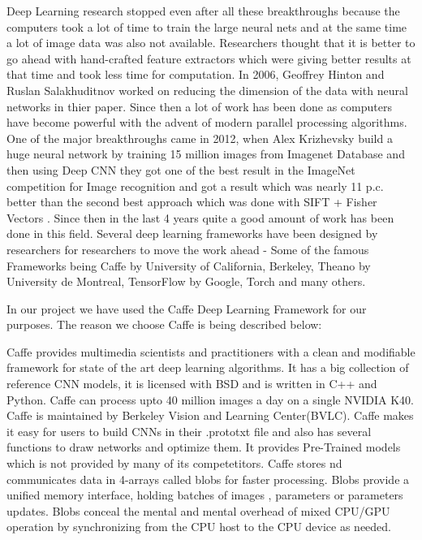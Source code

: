 Deep Learning research stopped even after all these breakthroughs because the computers took a lot of time to train the large neural nets and at the same time a lot of image data was also not available. Researchers thought that it is better to go ahead with hand-crafted feature extractors which were giving better results at that time and took less time for computation. In 2006, Geoffrey Hinton and Ruslan Salakhuditnov worked on reducing the dimension of the data with neural networks in thier paper\cite{dbn}. Since then a lot of work has been done as computers have become powerful with the advent of modern parallel processing algorithms. One of the major breakthroughs came in 2012, when Alex Krizhevsky\cite{krizhevsky} build a huge neural network by training 15 million images from Imagenet\cite{imagenet} Database and then using Deep CNN they got one of the best result in the ImageNet competition for Image recognition and got a result which  was nearly 11 p.c. better than the second best approach which was done with SIFT + Fisher Vectors \cite{siftfisher}. Since then in the last 4 years quite a good amount of work has been done in this field. Several deep learning frameworks have been designed by researchers for researchers to move the work ahead - Some of the famous Frameworks being Caffe\cite{caffe} by University of California, Berkeley, Theano\cite{theano} by University de Montreal, TensorFlow\cite{tensorflow} by Google, Torch\cite{torch} and many others.

In our project we have used the Caffe Deep Learning Framework\cite{caffe} for our purposes. The reason we choose Caffe is being described below:

Caffe provides multimedia scientists and practitioners with a clean and modifiable framework for state of the art deep learning algorithms. It has a big collection of reference CNN models, it is licensed with BSD and is written in C++ and Python. Caffe can process upto 40 million images a day on a single NVIDIA K40. Caffe is maintained by Berkeley Vision and Learning Center(BVLC). Caffe makes it easy for users to build CNNs in their .prototxt file and also has several functions to draw networks and optimize them. It provides Pre-Trained models which is not provided by many of its competetitors. Caffe stores nd communicates data in 4-arrays called blobs for faster processing. Blobs provide a unified memory interface, holding batches of images , parameters or parameters updates. Blobs conceal the mental and mental overhead of mixed CPU/GPU operation by synchronizing from the CPU host to the CPU device as needed. 

